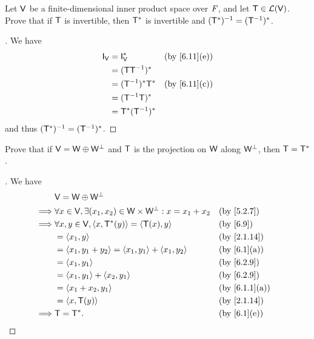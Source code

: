 \begin{ex}\label{ex:6.3.8}
  Let \(\mathsf{V}\) be a finite-dimensional inner product space over \(\mathit{F}\), and let \(\mathsf{T} \in \mathcal{L}(\mathsf{V})\).
  Prove that if \(\mathsf{T}\) is invertible, then \(\mathsf{T}^*\) is invertible and \((\mathsf{T}^*)^{-1} = (\mathsf{T}^{-1})^*\).
\end{ex}

\begin{proof}[]
  We have
  \begin{align*}
    \IT[\V] & = \IT[\V]^*        &  & \by{6.11}[e] \\
            & = (\T \T^{-1})^*                     \\
            & = (\T^{-1})^* \T^* &  & \by{6.11}[c] \\
            & = (\T^{-1} \T)^*                     \\
            & = \T^* (\T^{-1})^*
  \end{align*}
  and thus \((\mathsf{T}^*)^{-1} = (\mathsf{T}^{-1})^*\).
\end{proof}

\begin{ex}\label{ex:6.3.9}
  Prove that if \(\mathsf{V} = \mathsf{W} \oplus \mathsf{W}^{\perp}\) and \(\mathsf{T}\) is the projection on \(\mathsf{W}\) along \(\mathsf{W}^{\perp}\), then \(\mathsf{T} = \mathsf{T}^*\).
\end{ex}

\begin{proof}[]
  We have
  \begin{align*}
             & \V = \W \oplus \W^{\perp}                                                                        \\
    \implies & \forall x \in \V, \exists (x_1, x_2) \in \W \times \W^{\perp} : x = x_1 + x_2 &  & \by{5.2.7}    \\
    \implies & \forall x, y \in \V, \inn{x, \T^*(y)} = \inn{\T(x), y}                        &  & \by{6.9}      \\
             & = \inn{x_1, y}                                                                &  & \by{2.1.14}   \\
             & = \inn{x_1, y_1 + y_2} = \inn{x_1, y_1} + \inn{x_1, y_2}                      &  & \by{6.1}[a]   \\
             & = \inn{x_1, y_1}                                                              &  & \by{6.2.9}    \\
             & = \inn{x_1, y_1} + \inn{x_2, y_1}                                             &  & \by{6.2.9}    \\
             & = \inn{x_1 + x_2, y_1}                                                        &  & \by{6.1.1}[a] \\
             & = \inn{x, \T(y)}                                                              &  & \by{2.1.14}   \\
    \implies & \T = \T^*.                                                                    &  & \by{6.1}[e]
  \end{align*}
\end{proof}


